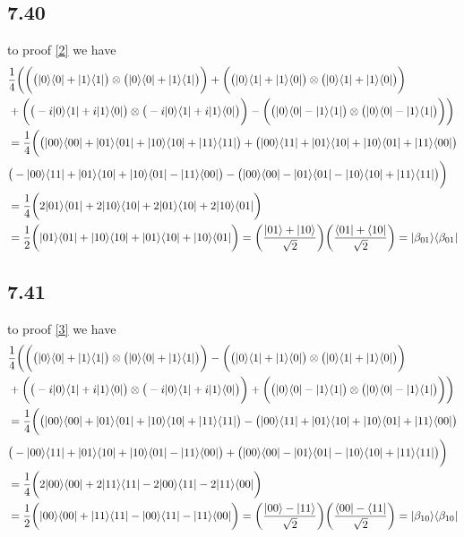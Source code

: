 \documentclass{article}
\newcommand{\op}[2]{|#1\rangle \langle#2|}
\newcommand{\tensor}[2]{#1 \otimes #2}
\begin{document}
\subsection*{7.40}
to proof \ref{2} we have
\begin{align*}
   &\frac{1}{4}\bigg(\bigg(\tensor{\big(\op{0}{0}+\op{1}{1}\big)}{\big(\op{0}{0}+\op{1}{1}\big)}\bigg)+\bigg(\tensor{\big(\op{0}{1}+\op{1}{0}\big)}{\big(\op{0}{1}+\op{1}{0}\big)}\bigg)\\&
   +\bigg(\tensor{\big(-i\op{0}{1}+i\op{1}{0}\big)}{\big(-i\op{0}{1}+i\op{1}{0}\big)}\bigg)-\bigg(\tensor{\big(\op{0}{0}-\op{1}{1}\big)}{\big(\op{0}{0}-\op{1}{1}\big)}\bigg)\bigg) \\
   &= \frac{1}{4}\bigg(\big(\op{00}{00}+\op{01}{01}+\op{10}{10}+\op{11}{11}\big)+\big(\op{00}{11}+\op{01}{10}+\op{10}{01}+\op{11}{00}\big)\\
   &\big(-\op{00}{11}+\op{01}{10}+\op{10}{01}-\op{11}{00}\big)-\big(\op{00}{00}-\op{01}{01}-\op{10}{10}+\op{11}{11}\big)\bigg)\\
   &=\frac{1}{4}\bigg(2\op{01}{01}+2\op{10}{10}+2\op{01}{10}+2\op{10}{01}\bigg)\\
   &=\frac{1}{2}\bigg(\op{01}{01}+\op{10}{10}+\op{01}{10}+\op{10}{01}\bigg) = \bigg(\frac{\ket{01}+\ket{10}}{\sqrt{2}}\bigg)\bigg(\frac{\bra{01}+\bra{10}}{\sqrt{2}}\bigg) = \op{\beta_{01}}{\beta_{01}}
\end{align*}
\subsection*{7.41}
to proof \ref{3} we have
\begin{align*}
   &\frac{1}{4}\bigg(\bigg(\tensor{\big(\op{0}{0}+\op{1}{1}\big)}{\big(\op{0}{0}+\op{1}{1}\big)}\bigg)-\bigg(\tensor{\big(\op{0}{1}+\op{1}{0}\big)}{\big(\op{0}{1}+\op{1}{0}\big)}\bigg)\\&
   +\bigg(\tensor{\big(-i\op{0}{1}+i\op{1}{0}\big)}{\big(-i\op{0}{1}+i\op{1}{0}\big)}\bigg)+\bigg(\tensor{\big(\op{0}{0}-\op{1}{1}\big)}{\big(\op{0}{0}-\op{1}{1}\big)}\bigg)\bigg) \\
   &= \frac{1}{4}\bigg(\big(\op{00}{00}+\op{01}{01}+\op{10}{10}+\op{11}{11}\big)-\big(\op{00}{11}+\op{01}{10}+\op{10}{01}+\op{11}{00}\big)\\
   &\big(-\op{00}{11}+\op{01}{10}+\op{10}{01}-\op{11}{00}\big)+\big(\op{00}{00}-\op{01}{01}-\op{10}{10}+\op{11}{11}\big)\bigg)\\
   &=\frac{1}{4}\bigg(2\op{00}{00}+2\op{11}{11}-2\op{00}{11}-2\op{11}{00}\bigg)\\
   &=\frac{1}{2}\bigg(\op{00}{00}+\op{11}{11}-\op{00}{11}-\op{11}{00}\bigg) = \bigg(\frac{\ket{00}-\ket{11}}{\sqrt{2}}\bigg)\bigg(\frac{\bra{00}-\bra{11}}{\sqrt{2}}\bigg) = \op{\beta_{10}}{\beta_{10}}
\end{align*}
\end{document}
